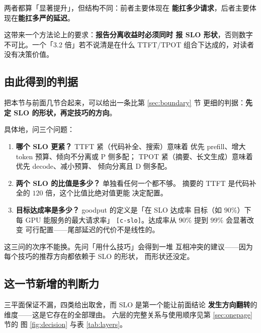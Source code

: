 \noindent 两者都算「显著提升」，但结构不同：前者主要体现在
\textbf{能扛多少请求}，后者主要体现在\textbf{能扛多严的延迟}。

\noindent 这带来一个方法论上的要求：\textbf{报告分离收益时必须同时
报 SLO 形状}，否则数字不可比。一个「3.2 倍」若不说清是在什么
TTFT/TPOT 组合下达成的，对读者没有决策价值。

\subsection{由此得到的判据}

把本节与前面几节合起来，可以给出一条比第 \ref{sec:boundary} 节
更细的判据：\textbf{先定 SLO 的形状，再定技巧的方向}。

\noindent 具体地，问三个问题：

\begin{enumerate}[leftmargin=1.4em,itemsep=2pt,topsep=3pt]
  \item \textbf{哪个 SLO 更紧？} TTFT 紧（代码补全、搜索）意味着
        优先 prefill、增大 token 预算、倾向不分离或 P 侧多配；
        TPOT 紧（摘要、长文生成）意味着优先 decode、减小预算、
        倾向分离且 D 侧多配。
  \item \textbf{两个 SLO 的比值是多少？} 单独看任何一个都不够。
        摘要的 TTFT 是代码补全的 $120$ 倍，这个比值比绝对值更能
        决定配置。
  \item \textbf{目标达成率是多少？} goodput 的定义是「在 SLO 达成率
        目标（如 $90\%$）下每 GPU 能服务的最大请求率」
        \texttt{[c-slo]}。达成率从 $90\%$ 提到 $99\%$ 会显著改变
        可行配置——尾部延迟的代价不是线性的。
\end{enumerate}

\noindent 这三问的次序不能换。先问「用什么技巧」会得到一堆
互相冲突的建议——因为每个技巧的推荐方向都依赖于 SLO 的形状，
而形状还没定。

\subsection{这一节新增的判断力}

三平面保证不漏，四类给出取舍，而 SLO 是第一个能让前面结论
\textbf{发生方向翻转}的维度——这是它存在的全部理由。
六层的完整关系与使用顺序见第 \ref{sec:onepage} 节的
图 \ref{fig:decision} 与表 \ref{tab:layers}。

